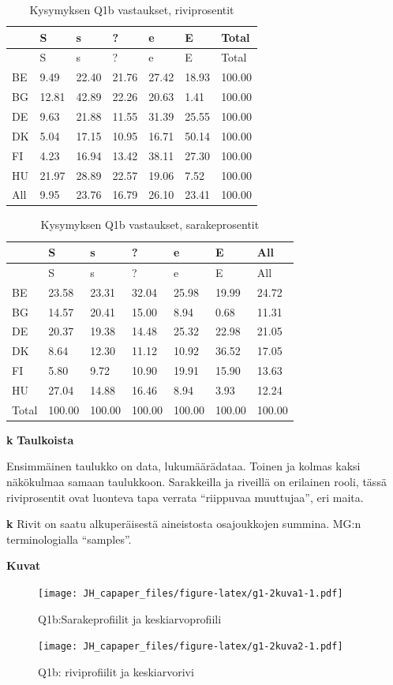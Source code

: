 \documentclass[
  finnish,
]{book}
\begin{document}
\begin{longtable}[]{@{}lllllll@{}}
\caption{Kysymyksen Q1b vastaukset, riviprosentit}\tabularnewline
\toprule
& S & s & ? & e & E & Total\tabularnewline
\midrule
\endfirsthead
\toprule
& S & s & ? & e & E & Total\tabularnewline
\midrule
\endhead
BE & 9.49 & 22.40 & 21.76 & 27.42 & 18.93 & 100.00\tabularnewline
BG & 12.81 & 42.89 & 22.26 & 20.63 & 1.41 & 100.00\tabularnewline
DE & 9.63 & 21.88 & 11.55 & 31.39 & 25.55 & 100.00\tabularnewline
DK & 5.04 & 17.15 & 10.95 & 16.71 & 50.14 & 100.00\tabularnewline
FI & 4.23 & 16.94 & 13.42 & 38.11 & 27.30 & 100.00\tabularnewline
HU & 21.97 & 28.89 & 22.57 & 19.06 & 7.52 & 100.00\tabularnewline
All & 9.95 & 23.76 & 16.79 & 26.10 & 23.41 & 100.00\tabularnewline
\bottomrule
\end{longtable}

\begin{longtable}[]{@{}lllllll@{}}
\caption{Kysymyksen Q1b vastaukset, sarakeprosentit}\tabularnewline
\toprule
& S & s & ? & e & E & All\tabularnewline
\midrule
\endfirsthead
\toprule
& S & s & ? & e & E & All\tabularnewline
\midrule
\endhead
BE & 23.58 & 23.31 & 32.04 & 25.98 & 19.99 & 24.72\tabularnewline
BG & 14.57 & 20.41 & 15.00 & 8.94 & 0.68 & 11.31\tabularnewline
DE & 20.37 & 19.38 & 14.48 & 25.32 & 22.98 & 21.05\tabularnewline
DK & 8.64 & 12.30 & 11.12 & 10.92 & 36.52 & 17.05\tabularnewline
FI & 5.80 & 9.72 & 10.90 & 19.91 & 15.90 & 13.63\tabularnewline
HU & 27.04 & 14.88 & 16.46 & 8.94 & 3.93 & 12.24\tabularnewline
Total & 100.00 & 100.00 & 100.00 & 100.00 & 100.00 &
100.00\tabularnewline
\bottomrule
\end{longtable}

\textbf{k} \textbf{Taulkoista}

Ensimmäinen taulukko on data, lukumäärädataa. Toinen ja kolmas kaksi
näkökulmaa samaan taulukkoon. Sarakkeilla ja riveillä on erilainen
rooli, tässä riviprosentit ovat luonteva tapa verrata ``riippuvaa
muuttujaa'', eri maita.

\textbf{k} Rivit on saatu alkuperäisestä aineistosta osajoukkojen
summina. MG:n terminologialla ``samples''.

\textbf{Kuvat}

\begin{figure}
\centering
\texttt{[image: JH\_capaper\_files/figure-latex/g1-2kuva1-1.pdf]}
\caption{Q1b:Sarakeprofiilit ja keskiarvoprofiili}
\end{figure}

\begin{figure}
\centering
\texttt{[image: JH\_capaper\_files/figure-latex/g1-2kuva2-1.pdf]}
\caption{Q1b: riviprofiilit ja keskiarvorivi}
\end{figure}
\end{document}
